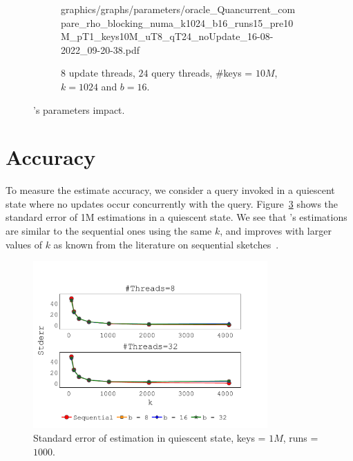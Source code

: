 \begin{figure}[htp!]
\begin{subfigure}{\textwidth}
    {graphics/graphs/parameters/oracle_Quancurrent_compare_rho_blocking_numa_k1024_b16_runs15_pre10M_pT1_keys10M_uT8_qT24_noUpdate_16-08-2022_09-20-38.pdf}
    \caption{$8$ update threads, $24$ query threads, \#keys = $10M$, $k=1024$ and $b=16$.}
    \label{fig: update_query_compare_rho}
    \end{subfigure}
\caption{\mysketch's parameters impact.}
\label{fig: parameters_exploration}
\end{figure}

\section{Accuracy}
\label{sec:accuracy} 
To measure the estimate accuracy, we consider a query invoked in a quiescent state where no updates occur concurrently with the query. Figure~\ref{fig: accuracy_stderr} shows the standard error of 1M estimations in a quiescent state.%
We see that \mysketch's estimations are similar to the sequential ones using the same $k$, and improves with larger values of $k$ as known from the literature on sequential sketches~\cite{mergeables_summaries}.
\begin{figure}[h!]
    \centering
    \includegraphics[width=0.8\textwidth,trim={0 0cm 0cm 1.7cm},clip]
    {graphics/graphs/accuracy/oracle_Quancurrent_block_numa_query_hist_stderr_qs_keys983040_runs1000_k_64_128_256_512_1024_2048_4096_b_8_16_32_T_8_32_11-08-2022_20-26-21.pdf}
    \caption{Standard error of estimation in quiescent state, keys = $1M$, runs = $1000$.}
    \label{fig: accuracy_stderr}
\end{figure}

